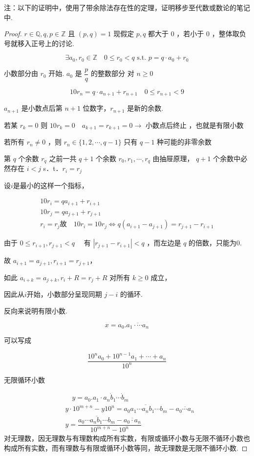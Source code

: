 注：以下的证明中，使用了带余除法存在性的定理，证明移步至代数或数论的笔记中.
\begin{proof}
	$r \in \mathbb{Q}, q, p \in \mathbb{Z} $ 且 $(p, q)=1$ 现假定 $p, q$ 都大于 0 ，若小于 0 ，整体取负号就移入正号上的讨论.
	
	$$
	\exists a_0, r_0 \in \mathbb{Z}\quad0 \leqslant r_0<q \text { s.t. } p=q \cdot a_0+r_0
	$$
	
	
	小数部分由 $r_0$ 开始. $a_0$ 是 $\dfrac{p}{q}$ 的整数部分
	对 $n \geqslant 0$
	
	$$
	10 r_n=q \cdot a_{n+1}+r_{n+1} \quad 0 \leqslant r_{n+1}<9
	$$
	
	$a_{n+1}$ 是小数点后第 $n+1$ 位数字，$r_{n+1}$ 是新的余数.
	
	若某 $r_k=0$ 则 $10 r_k=0 \quad a_{k+1}=r_{k+1}=0 \rightarrow$ 小数点后终止 ，也就是有限小数
	
	若所有 $r_n \neq 0$ ，则 $r_n \in\{1,2, \cdots, q-1\}$ 只有 $q-1$ 种可能的非零余数
	
	第 $q$ 个余数 $r_q$ 之前一共 $q+1$ 个余数 $r_0, r_1, \cdots, r_q$ 由抽屉原理，
	$q+1$ 个余数中必然存在 $i<j$ s．t．$r_i=r_j$
	
	设$i$是最小的这样一个指标，
	
	$$
	\begin{gathered}
		10 r_i=q a_{i+1}+r_{i+1} \\
		10 r_j=qa_{j+1}+r_{j+1} \\
		r_i=r_j\text{故} \quad 10 r_i=10 r_j \Leftrightarrow q\left(a_{i+1}-a_{j+1}\right)=r_{j+1}-r_{i+1}
	\end{gathered}
	$$
	
	由于 $0 \leqslant r_{i+1}, r_{j+1}<q \quad$ 有 $\left|r_{j+1}-r_{i+1}\right|<q$ ，而左边是 $q$ 的倍数，只能为0.
	
	故 $a_{i+1}=a_{j+1}, r_{i+1}=r_{j+1}$，
	
	如此 $a_{i+k}=a_{j+k}, r_i+R=r_j+R$ 对所有 $k \geqslant 0$ 成立，
	
	因此从$i$开始，小数部分呈现同期 $j-i$ 的循环.
	
	反向来说明有限小数.
	
	$$
	x=a_0 .\overline{a_1 \cdot \cdots a_n}
	$$
	
	
	可以写成
	
	$$
	\dfrac{10^na_0+10^{n-1}a_1+\cdots+a_n}{10^n}
	$$
	
	无限循环小数
	
	$$
	\begin{aligned}
		& \quad y=a_{0}. a_1 \cdot a_n \dot{b}_1 \cdots \dot{b}_m \\
		& y \cdot 10^{m+n}-y 10^n=\overline{a_0 a_1 \cdots a_n b_1 \cdots b_m}-\overline{a_0 \cdots a_n} \\
		& y=\dfrac{\overline{a_0 \cdots a_n b_1 \cdots b_m}-\overline{a_0 \cdot a_n}}{10^{m+n}-10^n}
	\end{aligned}
	$$
	对无理数，因无理数与有理数构成所有实数，有限或循环小数与无限不循环小数也构成所有实数，而有理数与有限或循环小数等同，故无理数是无限不循环小数.
\end{proof}
